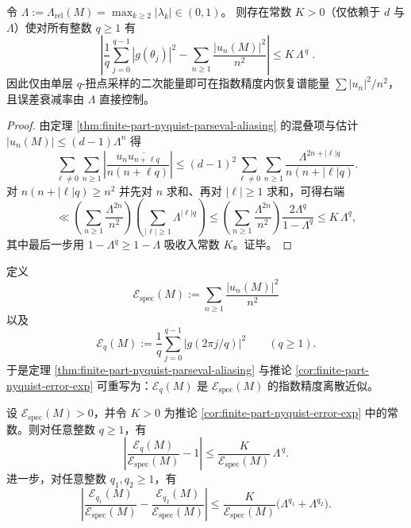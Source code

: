 \begin{corollary}\label{cor:finite-part-nyquist-error-exp}
令 \(\Lambda:=\Lambda_{\mathrm{rel}}(M)=\max_{k\ge 2}|\lambda_k|\in(0,1)\)。
则存在常数 \(K>0\)（仅依赖于 \(d\) 与 \(\Lambda\)）使对所有整数 \(q\ge 1\) 有
\[
\boxed{\;
\left|\frac{1}{q}\sum_{j=0}^{q-1}|g(\theta_j)|^2-\sum_{n\ge 1}\frac{|u_n(M)|^2}{n^2}\right|
\le K\,\Lambda^{\,q}\; }.
\]
因此仅由单层 \(q\)-扭点采样的二次能量即可在指数精度内恢复谱能量 \(\sum |u_n|^2/n^2\)，且误差衰减率由 \(\Lambda\) 直接控制。
\end{corollary}
\begin{proof}
由定理 \ref{thm:finite-part-nyquist-parseval-aliasing} 的混叠项与估计 \(|u_n(M)|\le (d-1)\Lambda^{n}\) 得
\[
\sum_{\ell\ne 0}\sum_{n\ge 1}\left|\frac{u_n\overline{u_{n+\ell q}}}{n(n+\ell q)}\right|
\le
(d-1)^2\sum_{\ell\ne 0}\sum_{n\ge 1}\frac{\Lambda^{2n+|\ell|q}}{n(n+|\ell|q)}.
\]
对 \(n(n+|\ell|q)\ge n^2\) 并先对 \(n\) 求和、再对 \(|\ell|\ge 1\) 求和，可得右端
\[
\ll
\left(\sum_{n\ge 1}\frac{\Lambda^{2n}}{n^2}\right)\left(\sum_{|\ell|\ge 1}\Lambda^{|\ell|q}\right)
\le
\left(\sum_{n\ge 1}\frac{\Lambda^{2n}}{n^2}\right)\frac{2\Lambda^{q}}{1-\Lambda^{q}}
\le
K\,\Lambda^{q},
\]
其中最后一步用 \(1-\Lambda^{q}\ge 1-\Lambda\) 吸收入常数 \(K\)。证毕。
\end{proof}

\begin{definition}\label{def:finite-part-nyquist-energy-ledger}
定义
\[
\mathcal E_{\mathrm{spec}}(M)
:=
\sum_{n\ge 1}\frac{|u_n(M)|^2}{n^2}
\]
以及
\[
\mathcal E_q(M)
:=
\frac{1}{q}\sum_{j=0}^{q-1}|g(2\pi j/q)|^2
\qquad(q\ge 1).
\]
于是定理 \ref{thm:finite-part-nyquist-parseval-aliasing} 与推论 \ref{cor:finite-part-nyquist-error-exp} 可重写为：\(\mathcal E_q(M)\) 是 \(\mathcal E_{\mathrm{spec}}(M)\) 的指数精度离散近似。
\end{definition}

\begin{proposition}\label{prop:finite-part-nyquist-proportion-stability}
设 \(\mathcal E_{\mathrm{spec}}(M)>0\)，并令 \(K>0\) 为推论 \ref{cor:finite-part-nyquist-error-exp} 中的常数。则对任意整数 \(q\ge 1\)，有
\[
\left|
\frac{\mathcal E_q(M)}{\mathcal E_{\mathrm{spec}}(M)}-1
\right|
\le
\frac{K}{\mathcal E_{\mathrm{spec}}(M)}\,\Lambda^{\,q}.
\]
进一步，对任意整数 \(q_1,q_2\ge 1\)，有
\[
\left|
\frac{\mathcal E_{q_1}(M)}{\mathcal E_{\mathrm{spec}}(M)}
-
\frac{\mathcal E_{q_2}(M)}{\mathcal E_{\mathrm{spec}}(M)}
\right|
\le
\frac{K}{\mathcal E_{\mathrm{spec}}(M)}\bigl(\Lambda^{q_1}+\Lambda^{q_2}\bigr).
\]
\end{proposition}

